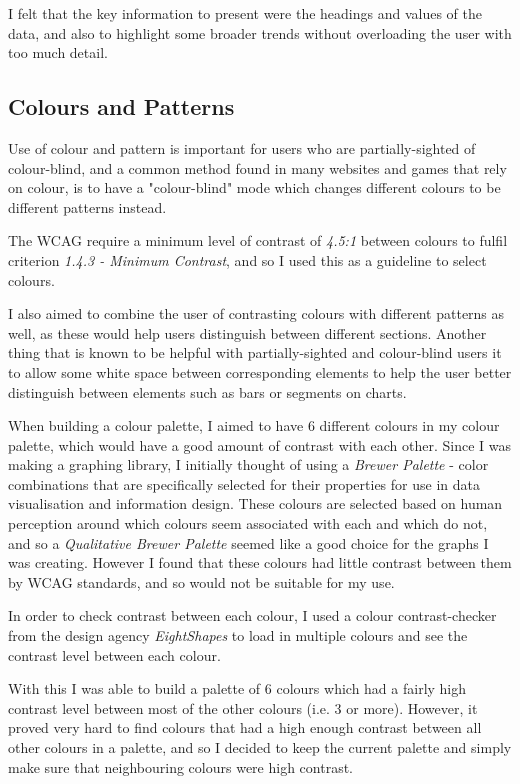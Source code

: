 \documentclass[ %
                    author={Aleena Baig},
                supervisor={Dr Simon Lock},
                    degree={BSc},
                     title={On Making Web Accessible Graphs},
                  subtitle={},
                      year={2019} ]{dissertation}
\begin{document}
I felt that the key information to present were the headings and values of the data, and also to highlight some broader trends without overloading the user with too much detail.

    
\subsection{Colours and Patterns}

Use of colour and pattern is important for users who are partially-sighted of colour-blind, and a common method found in many websites and games that rely on colour, is to have a "colour-blind" mode which changes different colours to be different patterns instead.

The WCAG require a minimum level of contrast of \textit{4.5:1} between colours to fulfil criterion \textit{1.4.3 - Minimum Contrast}, and so I used this as a guideline to select colours.

I also aimed to combine the user of contrasting colours with different patterns as well, as these would help users distinguish between different sections. Another thing that is known to be helpful with partially-sighted and colour-blind users it to allow some white space between corresponding elements to help the user better distinguish between elements such as bars or segments on charts.

When building a colour palette, I aimed to have 6 different colours in my colour palette, which would have a good amount of contrast with each other. Since I was making a graphing library, I initially thought of using a \textit{Brewer Palette} - color combinations that are specifically selected for their properties for use in data visualisation and information design. These colours are selected based on human perception around which colours seem associated with each and which do not, and so a \textit{Qualitative Brewer Palette} seemed like a good choice for the graphs I was creating. However I found that these colours had little contrast between them by WCAG standards, and so would not be suitable for my use.

In order to check contrast between each colour, I used a colour contrast-checker from the design agency \textit{EightShapes} to load in multiple colours and see the contrast level between each colour.


With this I was able to build a palette of 6 colours which had a fairly high contrast level between most of the other colours (i.e. 3 or more). However, it proved very hard to find colours that had a high enough contrast between all other colours in a palette, and so I decided to keep the current palette and simply make sure that neighbouring colours were high contrast.
\end{document}

